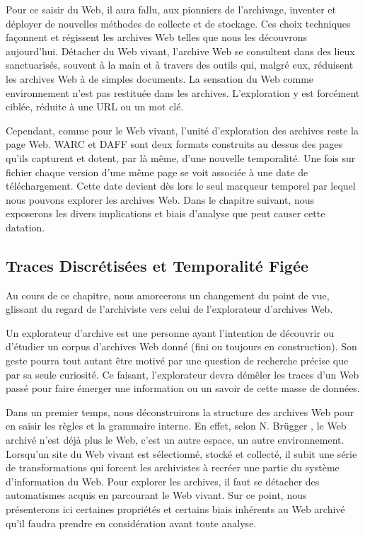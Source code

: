 \documentclass[symmetric,justified,marginals=raggedouter]{tufte-book}
\begin{document}
Pour ce saisir du Web, il aura fallu, aux pionniers de l'archivage, inventer et déployer de nouvelles méthodes de collecte et de stockage. Ces choix techniques façonnent et régissent les archives Web telles que nous les découvrons aujourd'hui. Détacher du Web vivant, l'archive Web se consultent dans des lieux sanctuarisés, souvent à la main et à travers des outils qui, malgré eux, réduisent les archives Web à de simples documents. La sensation du Web comme environnement n'est pas restituée dans les archives. L'exploration y est forcément ciblée, réduite à une URL ou un mot clé. 

Cependant, comme pour le Web vivant, l'unité d'exploration des archives reste la page Web. WARC et DAFF sont deux formats construits au dessus des pages qu'ils capturent et dotent, par là même, d'une nouvelle temporalité. Une fois sur fichier chaque version d'une même page se voit associée à une date de téléchargement. Cette date devient dès lors le seul marqueur temporel par lequel nous pouvons explorer les archives Web. Dans le chapitre suivant, nous exposerons les divers implications et biais d'analyse que peut causer cette datation.


\cleardoublepage
\begin{minipage}[t,leftmargin=5em]{1.5\linewidth}%
\begin{adjustwidth}{-0.5cm}{}
\chapter{Traces Discrétisées et Temporalité Figée} 
\label{chap:4}
\end{adjustwidth}
\end{minipage}
\hfill

\noindent Au cours de ce chapitre, nous amorcerons un changement du point de vue, glissant du regard de l'archiviste vers celui de l'explorateur d'archives Web. 

Un explorateur d'archive est une personne ayant l'intention de découvrir ou d'étudier un corpus d'archives Web donné (fini ou toujours en construction). Son geste pourra tout autant être motivé par une question de recherche précise que par sa seule curiosité. Ce faisant, l'explorateur devra démêler les traces d'un Web passé pour faire émer\-ger une information ou un savoir de cette masse de données. 

Dans un premier temps, nous déconstruirons la structure des ar\-chives Web pour en saisir les règles et la grammaire interne. En effet, selon N. Brügger \citep{brugger_website_2009}, le Web archivé n'est déjà plus le Web, c'est un autre espace, un autre environnement. Lorsqu'un site du Web vivant est sélectionné, stocké et collecté, il subit une série de transformations qui forcent les archivistes à recréer une partie du système d'information du Web. Pour explorer les archives, il faut se détacher des automatismes acquis en parcourant le Web vivant. Sur ce point, nous présenterons ici certaines propriétés et certains biais inhérents au Web archivé qu'il faudra prendre en considération avant toute analyse. 
\end{document}
